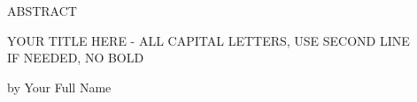 \documentclass[12pt, oneside]{book2}
\newcommand{\documentTitle}{YOUR TITLE HERE - ALL CAPITAL LETTERS, USE SECOND LINE \\IF NEEDED, NO BOLD}
\newcommand{\documentAuthor}{Your Full Name}
\begin{document}
\thispagestyle{empty}
\singlespacing

\begin{center}

    ABSTRACT

    \vspace{2.0cm}

    \documentTitle

    \vspace{1.0cm}

    by \documentAuthor

    \vspace{1.0cm}

\end{center}

\noindent


\newpage

\thispagestyle{empty}

\frontmatter

\doublespacing
\end{document}
